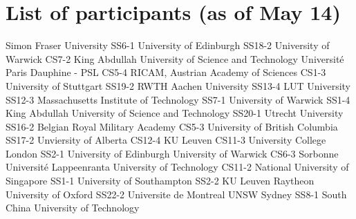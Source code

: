 \chapter{List of participants (as of May 14)}

\setlength{\columnsep}{1cm}

\begin{multicols}{2}

\small
\raggedright

{ Simon Fraser University }
{SS6-1}
{}
{ University of Edinburgh }
{SS18-2}
{}
{ University of Warwick }
{CS7-2}
{}
{ King Abdullah University of Science and Technology }
{}
{}
{ Université Paris Dauphine - PSL }
{CS5-4}
{}
{ RICAM, Austrian Academy of Sciences }
{CS1-3}
{}
{ University of Stuttgart }
{SS19-2}
{}
{ RWTH Aachen University }
{SS13-4}
{}
{ LUT University }
{SS12-3}
{}
{ Massachusetts Institute of Technology }
{SS7-1}
{}
{ University of Warwick }
{SS1-4}
{}
{ King Abdullah University of Science and Technology }
{SS20-1}
{}
{ Utrecht University }
{SS16-2}
{}
{ Belgian Royal Military Academy }
{CS5-3}
{}
{ University of British Columbia }
{SS17-2}
{}
{ Unviersity of Alberta }
{CS12-4}
{}
{ KU Leuven }
{CS11-3}
{}
{ University College London }
{SS2-1}
{}
{ University of Edinburgh }
{}
{}
{ University of Warwick }
{CS6-3}
{}
{ Sorbonne Université }
{}
{}
{ Lappeenranta University of Technology }
{CS11-2}
{}
{ National University of Singapore }
{SS1-1}
{}
{ University of Southampton }
{SS2-2}
{}
{ KU Leuven }
{}
{}
{ Raytheon }
{}
{}
{ University of Oxford }
{SS22-2}
{}
{ Universite de Montreal }
{}
{}
{ UNSW Sydney }
{SS8-1}
{}
{ South China University of Technology }

\end{multicols}

